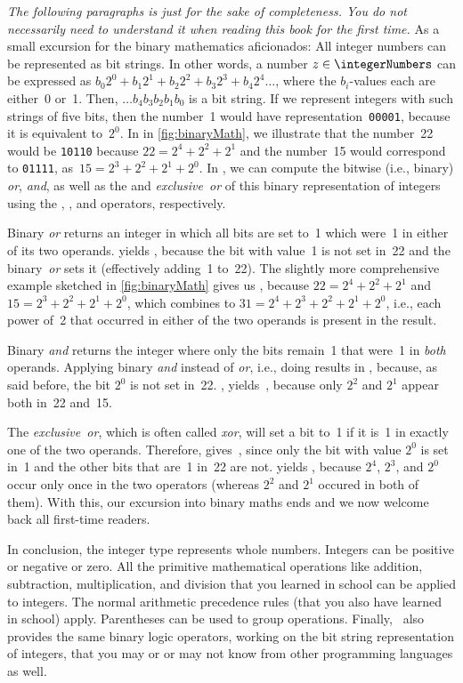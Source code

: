 \emph{The following paragraphs is just for the sake of completeness. %
You do not necessarily need to understand it when reading this book for the first time.}
As a small excursion for the binary mathematics aficionados:
All integer numbers can be represented as bit strings.
In other words, a number $z\in\integerNumbers$ can be expressed as $b_0 2^0 + b_1 2^1 + b_2 2^2 + b_3 2^3 + b_4 2^4\dots$, where the $b_i$-values each are either~0 or~1.
Then, $\dots b_4 b_3 b_2 b_1 b_0$ is a bit string.
If we represent integers with such strings of five bits, then the number~1 would have representation~\texttt{00001}, because it is equivalent to~$2^0$.
In in \cref{fig:binaryMath}, we illustrate that the number~22 would be \texttt{10110} because $22=2^4+2^2+2^1$ and the number~15 would correspond to \texttt{01111}, as~$15=2^3+2^2+2^1+2^0$.
In \python, we can compute the bitwise (i.e., binary) \emph{or}, \emph{and}, as well as the and \emph{exclusive~or} of this binary representation of integers using the \pythonil{|}, \pythonil{&}, and \pythonil{^} operators, respectively.

Binary \emph{or} returns an integer in which all bits are set to~1 which were~1 in either of its two operands.
 yields , because the bit with value~1 is not set in~22 and the binary~\emph{or} sets it (effectively adding~1 to~22).
The slightly more comprehensive example  sketched in \cref{fig:binaryMath} gives us , because $22=2^4+2^2+2^1$ and $15=2^3+2^2+2^1+2^0$, which \pythonil{|} combines to $31=2^4+2^3+2^2+2^1+2^0$, i.e., each power of~2 that occurred in either of the two operands is present in the result.

Binary \emph{and} returns the integer where only the bits remain~1 that were~1 in \emph{both} operands.
Applying binary \emph{and} instead of \emph{or}, i.e., doing  results in , because, as said before, the bit $2^0$ is not set in~22.
, yields~, because only $2^2$ and $2^1$ appear both in~22 and~15.

The \emph{exclusive~or}, which is often called \emph{xor}, will set a bit to~1 if it is~1 in exactly one of the two operands.
Therefore,  gives~, since only the bit with value $2^0$ is set in~1 and the other bits that are~1 in~22 are not.
 yields , because $2^4$, $2^3$, and $2^0$ occur only once in the two operators (whereas $2^2$ and $2^1$ occured in both of them).
With this, our excursion into binary maths ends and we now welcome back all first-time readers.

In conclusion, the integer type  represents whole numbers.
Integers can be positive or negative or zero.
All the primitive mathematical operations like addition, subtraction, multiplication, and division that you learned in school can be applied to integers.
The normal arithmetic precedence rules (that you also have learned in school) apply.
Parentheses can be used to group operations.
Finally, \python\ also provides the same binary logic operators, working on the bit string representation of integers, that you may or or may not know from other programming languages as well.
%
\endhsection%
%
